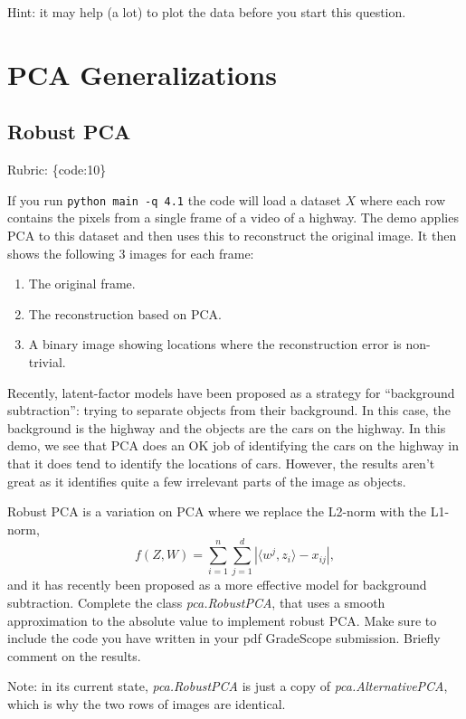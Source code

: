 \documentclass{article}
\def\rubric#1{\gre{Rubric: \{#1\}}}{}
\def\blu#1{{\color{blu}#1}}
\def\gre#1{{\color{gre}#1}}
\def\enum#1{\begin{enumerate}#1\end{enumerate}}
\begin{document}
Hint: it may help (a lot) to plot the data before you start this question.



\section{PCA Generalizations}

\subsection{Robust PCA}
\rubric{code:10}

If you run \verb|python main -q 4.1| the code will load a dataset $X$ where each row contains the pixels from a single frame of a video of a highway. The demo applies PCA to this dataset and then uses this to reconstruct the original image.
It then shows the following 3 images for each frame:
\enum{
\item The original frame.
\item The reconstruction based on PCA.
\item A binary image showing locations where the reconstruction error is non-trivial.
}
Recently, latent-factor models have been proposed as a strategy for ``background subtraction'': trying to separate objects from their background. In this case, the background is the highway and the objects are the cars on the highway. In this demo, we see that PCA does an OK job of identifying the cars on the highway in that it does tend to identify the locations of cars. However, the results aren't great as it identifies quite a few irrelevant parts of the image as objects.

Robust PCA is a variation on PCA where we replace the L2-norm with the L1-norm,
\[
f(Z,W) = \sum_{i=1}^n\sum_{j=1}^d |\langle w^j, z_i\rangle - x_{ij}|,
\]
and it has recently been proposed as a more effective model for background subtraction. \blu{Complete the class \emph{pca.RobustPCA},
that uses a smooth approximation to the absolute value to implement robust PCA. Make sure to include the code you have written in your pdf GradeScope submission. Briefly comment on the results.} 

Note: in its current state, \emph{pca.RobustPCA} is just a copy of \emph{pca.AlternativePCA}, which is why the two rows of images are identical.
\end{document}

